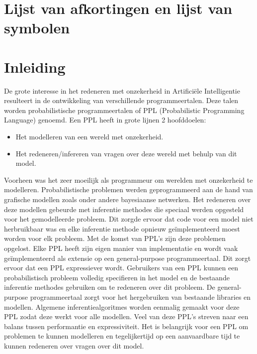 \documentclass[12pt,a4paper,oneside]{book}
\theoremstyle{definition}
\begin{document}
\chapter{Lijst van afkortingen en lijst van symbolen}
\tableofcontents


\newpage
\mainmatter
\setcounter{page}{0}

\chapter{Inleiding}
De grote interesse in het redeneren met onzekerheid in Artifici\"{e}le Intelligentie resulteert in de ontwikkeling van verschillende programmeertalen. Deze talen worden probabilistische programmeertalen of PPL (Probabilistic Programming Language) genoemd. Een PPL heeft in grote lijnen 2 hoofddoelen:
\begin{itemize}
  \item Het modelleren van een wereld met onzekerheid.
  \item Het redeneren/infereren van vragen over deze wereld met behulp van dit model.
\end{itemize}
Voorheen was het zeer moeilijk als programmeur om werelden met onzekerheid te modelleren. Probabilistische problemen werden geprogrammeerd aan de hand van grafische modellen zoals onder andere bayesiaanse netwerken. Het redeneren over deze modellen gebeurde met inferentie methodes die speciaal werden opgesteld voor het gemodelleerde probleem. Dit zorgde ervoor dat code voor een model niet herbruikbaar was en elke inferentie methode opnieuw ge\"{i}mplementeerd moest worden voor elk probleem. Met de komst van PPL's zijn deze problemen opgelost. Elke PPL heeft zijn eigen manier van implementatie en wordt vaak ge\"{i}mplementeerd als extensie op een general-purpose programmeertaal. Dit zorgt ervoor dat een PPL expressiever wordt. Gebruikers van een PPL kunnen een probabilistisch probleem volledig specifieren in het model en de bestaande inferentie methodes gebruiken om te redeneren over dit probleem. De general-purpose programmeertaal zorgt voor het hergebruiken van bestaande libraries en modellen. Algemene inferentiealgoritmes worden eenmalig gemaakt voor deze PPL zodat deze werkt voor alle modellen. Veel van deze PPL’s streven naar een balans tussen performantie en expressiviteit. Het is belangrijk voor een PPL om problemen te kunnen modelleren en tegelijkertijd op een aanvaardbare tijd te kunnen redeneren over vragen over dit model.
\end{document}
